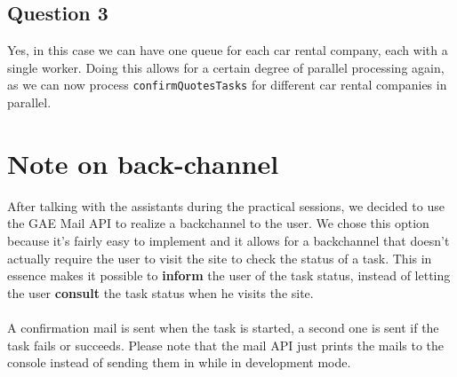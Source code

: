 \documentclass[]{article}
\begin{document}
\subsection{Question 3}

Yes, in this case we can have one queue for each car rental company, each with a single worker.
Doing this allows for a certain degree of parallel processing again, as we can now process \texttt{confirmQuotesTasks} for different car rental companies in parallel.

\section{Note on back-channel}

After talking with the assistants during the practical sessions, we decided to use the GAE Mail API to realize a backchannel to the user. We chose this option because it's fairly easy to implement and it allows for a backchannel that doesn't actually require the user to visit the site to check the status of a task. This in essence makes it possible to \textbf{inform} the user of the task status, instead of letting the user \textbf{consult} the task status when he visits the site. \\\\
A confirmation mail is sent when the task is started, a second one is sent if the task fails or succeeds. Please note that the mail API just prints the mails to the console instead of sending them in while in development mode.
\end{document}
